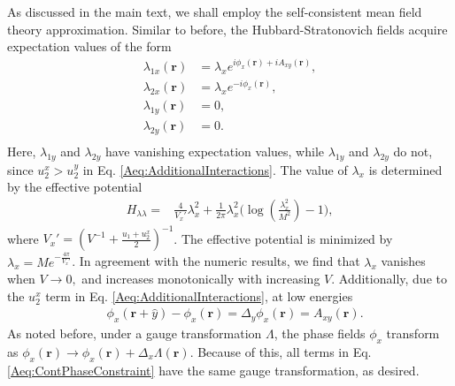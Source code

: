 \documentclass[prb,aps,twocolumn,groupaddress,floatfix]{revtex4-1}
\begin{document}
As discussed in the main text, we shall employ the self-consistent mean field theory approximation. Similar to before, the Hubbard-Stratonovich fields acquire expectation values of the form
\begin{equation}
\begin{split}
\lambda_{1x}(\bm{r}) &= \lambda_x e^{i\phi_x(\bm{r}) + iA_{xy}(\bm{r})},\\
\lambda_{2x}(\bm{r}) &= \lambda_x e^{-i\phi_x(\bm{r}) },\\
\lambda_{1y}(\bm{r}) &= 0,\\
\lambda_{2y}(\bm{r}) &= 0.\\
\end{split}\label{Aeq:ContSelfConsist}
\end{equation}
Here, $\lambda_{1y}$ and $\lambda_{2y}$ have vanishing expectation values, while $\lambda_{1y}$ and $\lambda_{2y}$ do not, since $u^x_2>u^y_2$ in Eq. \ref{Aeq:AdditionalInteractions}. The value of $\lambda_x$ is determined by the effective potential
\begin{equation}
\begin{split}
H_{\lambda\lambda} = &\frac{4}{V_x'} \lambda_x^2 + \frac{1}{2\pi}\lambda_x^2\Big(\log(\frac{\lambda_x^2}{M^2})-1\Big),
\end{split}
\end{equation} 
where $V_x' = (V^{-1} + \frac{u_1+u^x_2}{2} )^{-1}$. The effective potential is minimized by $\lambda_x = M e^{-\frac{4\pi}{V_x'}}$. In agreement with the numeric results, we find that $\lambda_x$ vanishes when $V \rightarrow 0,$ and increases monotonically with increasing $V$. Additionally, due to the $u^x_2$ term in Eq. \ref{Aeq:AdditionalInteractions}, at low energies 
\begin{equation}
\begin{split}
&\phi_x(\bm{r}+\hat{y})-\phi_x(\bm{r}) = \Delta_y\phi_x(\bm{r})  = A_{xy}(\bm{r}).
\end{split}\label{Aeq:ContPhaseConstraint}
\end{equation}
As noted before, under a gauge transformation $\Lambda$, the phase fields $\phi_x$ transform as $\phi_x(\bm{r}) \rightarrow \phi_x(\bm{r}) + \Delta_x \Lambda(\bm{r})$. Because of this, all terms in Eq. \ref{Aeq:ContPhaseConstraint} have the same gauge transformation, as desired. 
\end{document}
